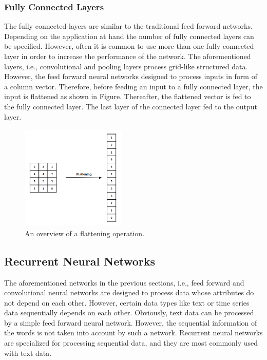 \subsubsection{Fully Connected Layers}
The fully connected layers are similar to the traditional feed forward networks. Depending on the application at hand the number of fully connected layers can be specified. However, often it is common to use more than one fully connected layer in order to increase the performance of the network. The aforementioned layers, i.e., convolutional and pooling layers process grid-like structured data. However, the feed forward neural networks designed to process inputs in form of a column vector. Therefore, before feeding an input to a fully connected layer, the input is flattened as shown in Figure.
Thereafter, the flattened vector is fed to the fully connected layer. The last layer of the connected layer fed to the output layer. 
\begin{figure}[h]
\centering
 \includegraphics[height=5cm,width=5cm]{Figures/fig_cnn_flattening.png}
 \caption{An overview of a flattening operation.}
 \label{fig:cnn_flattening}
\end{figure}
\subsection{Recurrent Neural Networks}
The aforementioned networks in the previous sections, i.e., feed forward and convolutional neural networks are designed to process data whose attributes do not depend on each other. However, certain data types like text or time  series data sequentially depends on each other. Obviously,  text data can be processed by a simple feed forward neural network. However, the sequential information of the words is not taken into account by such a network. Recurrent neural networks are specialized for processing sequential data, and they are most commonly used with text data. 

